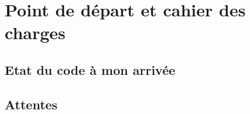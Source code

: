 \section{Point de départ et cahier des charges}


\subsection{Etat du code à mon arrivée}

\subsection{Attentes}





